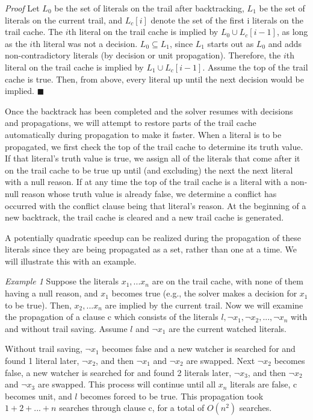 \documentclass{article}
\begin{document}
\textit{Proof} Let $L_0$ be the set of literals on the trail after backtracking, $L_1$ be the set of literals on the current trail, and $L_c[i]$ denote the set of the first i literals on the trail cache. The $i$th literal on the trail cache is implied by $L_0 \cup L_c[i-1]$, as long as the $i$th literal was not a decision. $L_0 \subseteq L_1$, since $L_1$ starts out as $L_0$ and adds non-contradictory literals (by decision or unit propagation). Therefore, the $i$th literal on the trail cache is implied by $L_1 \cup L_c[i-1]$. Assume the top of the trail cache is true. Then, from above, every literal up until the next decision would be implied. $\blacksquare$\newline

Once the backtrack has been completed and the solver resumes with decisions and propagations, we will attempt to restore parts of the trail cache automatically during propagation to make it faster. When a literal is to be propagated, we first check the top of the trail cache to determine its truth value. If that literal's truth value is true, we assign all of the literals that come after it on the trail cache to be true up until (and excluding) the next the next literal with a null reason. If at any time the top of the trail cache is a literal with a non-null reason whose truth value is already false, we determine a conflict has occurred with the conflict clause being that literal's reason. At the beginning of a new backtrack, the trail cache is cleared and a new trail cache is generated.

A potentially quadratic speedup can be realized during the propagation of these literals since they are being propagated as a set, rather than one at a time. We will illustrate this with an example.\newline

\textit{Example 1} Suppose the literals $x_1, ... x_n$ are on the trail cache, with none of them having a null reason, and $x_1$ becomes true (e.g., the solver makes a decision for $x_1$ to be true). Then, $x_2, ... x_n$ are implied by the current trail. Now we will examine the propagation of a clause c which consists of the literals $l, \lnot x_1, \lnot x_2, ..., \lnot x_n$ with and without trail saving. Assume $l$ and $\lnot x_1$ are the current watched literals.

Without trail saving, $\lnot x_1$ becomes false and a new watcher is searched for and found 1 literal later, $\lnot x_2$, and then $\lnot x_1$ and $\lnot x_2$ are swapped. Next $\lnot x_2$ becomes false, a new watcher is searched for and found 2 literals later, $\lnot x_3$, and then $\lnot x_2$ and $\lnot x_3$ are swapped. This process will continue until all $x_n$ literals are false, c becomes unit, and $l$ becomes forced to be true. This propagation took $1 + 2 + ... + n$ searches through clause c, for a total of $O(n^2)$ searches.
\end{document}
